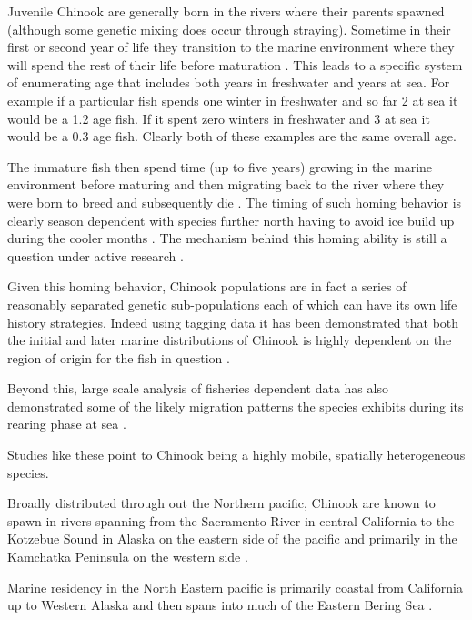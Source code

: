 \documentclass[11pt]{article}
\begin{document}
Juvenile Chinook are generally born in the rivers where their parents spawned (although some genetic mixing does occur through straying). Sometime in their first or second year of life they transition to the marine environment where they will spend the rest of their life before maturation \cite{oceanchinook}. This leads to a specific system of enumerating age that includes both years in freshwater and years at sea. For example if a particular fish spends one winter in freshwater and so far 2 at sea it would be a 1.2 age fish. If it spent zero winters in freshwater and 3 at sea it would be a 0.3 age fish. Clearly both of these examples are the same overall age.

The immature fish then spend time (up to five years) growing in the marine environment before maturing and then migrating back to the river where they were born to breed and subsequently die \cite{oceanchinook}. The timing of such homing behavior is clearly season dependent with species further north having to avoid ice build up during the cooler months \cite{oceanchinook}. The mechanism behind this homing ability is still a question under active research \cite{bracis2012}. \newline

Given this homing behavior, Chinook populations are in fact a series of reasonably separated genetic sub-populations each of which can have its own life history strategies. Indeed using tagging data it has been demonstrated that both the initial and later marine distributions of Chinook is highly dependent on the region of origin for the fish in question \cite{shelton2019} \cite{tucker2019}. 

Beyond this, large scale analysis of fisheries dependent data has also demonstrated some of the likely migration patterns the species exhibits during its rearing phase at sea \cite{langan2024}. 

Studies like these point to Chinook being a highly mobile, spatially heterogeneous species.\newline

Broadly distributed through out the Northern pacific, Chinook are known to spawn in rivers spanning from the Sacramento River in central California to the Kotzebue Sound in Alaska on the eastern side of the pacific and primarily in the Kamchatka Peninsula on the western side \cite{oceanchinook}. 

Marine residency in the North Eastern pacific is primarily coastal from California up to Western Alaska and then spans into much of the Eastern Bering Sea \cite{oceanchinook} \cite{langan2024}. \newline
\end{document}
